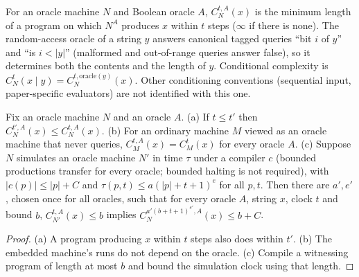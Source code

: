 \begin{definition}
  \label{def:avg-conditional}
  \leanok
  For an oracle machine $N$ and Boolean oracle $A$, $C^{t,A}_N(x)$ is the
  minimum length of a program on which $N^A$ produces $x$ within $t$ steps
  ($\infty$ if there is none). The random-access oracle of a string $y$ answers
  canonical tagged queries ``bit $i$ of $y$'' and ``is $i < |y|$'' (malformed
  and out-of-range queries answer false), so it determines both the contents
  and the length of $y$. Conditional complexity is
  $C^t_N(x \mid y) = C^{t, \mathrm{oracle}(y)}_N(x)$. Other conditioning
  conventions (sequential input, paper-specific evaluators) are not identified
  with this one.
\end{definition}

\begin{lemma}
  \label{lem:avg-oracle-kolmogorov}
  \leanok
  Fix an oracle machine $N$ and an oracle $A$. (a) If $t \le t'$ then
  $C^{t',A}_N(x) \le C^{t,A}_N(x)$. (b) For an ordinary machine $M$ viewed as
  an oracle machine that never queries, $C^{t,A}_M(x) = C^t_M(x)$ for every
  oracle $A$. (c) Suppose $N$ simulates an oracle machine $N'$ in time $\tau$
  under a compiler $c$ (bounded productions transfer for every oracle; bounded
  halting is not required), with $|c(p)| \le |p| + C$ and $\tau(p, t) \le a
  (|p| + t + 1)^e$ for all $p, t$. Then there are $a', e'$, chosen once for
  all oracles, such that for every oracle $A$, string $x$, clock $t$ and bound
  $b$, $C^{t,A}_{N'}(x) \le b$ implies
  $C^{a'(b + t + 1)^{e'},A}_N(x) \le b + C$.
\end{lemma}
\begin{proof}
  \leanok
  (a) A program producing $x$ within $t$ steps also does within $t'$. (b) The
  embedded machine's runs do not depend on the oracle. (c) Compile a
  witnessing program of length at most $b$ and bound the simulation clock using
  that length.
\end{proof}

